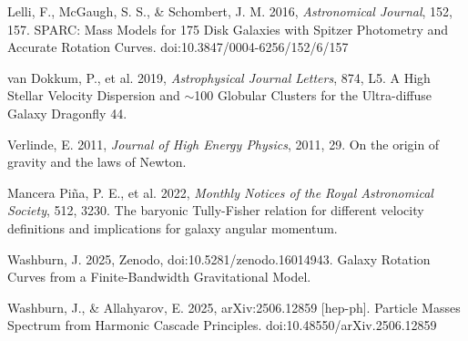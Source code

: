 \documentclass[usenatbib]{mnras}
\begin{document}
\begin{thebibliography}{99}
 Lelli, F., McGaugh, S. S., \& Schombert, J. M. 2016, \textit{Astronomical Journal}, 152, 157. SPARC: Mass Models for 175 Disk Galaxies with Spitzer Photometry and Accurate Rotation Curves. doi:10.3847/0004-6256/152/6/157

 van Dokkum, P., et al. 2019, \textit{Astrophysical Journal Letters}, 874, L5. A High Stellar Velocity Dispersion and $\sim$100 Globular Clusters for the Ultra-diffuse Galaxy Dragonfly 44.

 Verlinde, E. 2011, \textit{Journal of High Energy Physics}, 2011, 29. On the origin of gravity and the laws of Newton.

 Mancera Piña, P. E., et al. 2022, \textit{Monthly Notices of the Royal Astronomical Society}, 512, 3230. The baryonic Tully-Fisher relation for different velocity definitions and implications for galaxy angular momentum.

 Washburn, J. 2025, Zenodo, doi:10.5281/zenodo.16014943. Galaxy Rotation Curves from a Finite-Bandwidth Gravitational Model.

 Washburn, J., \& Allahyarov, E. 2025, arXiv:2506.12859 [hep-ph]. Particle Masses Spectrum from Harmonic Cascade Principles. doi:10.48550/arXiv.2506.12859
\end{thebibliography}
\end{document}

